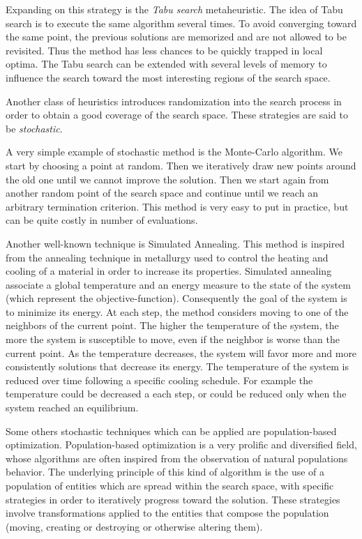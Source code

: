 Expanding on this strategy is the \emph{Tabu search} metaheuristic. The idea of Tabu search is to execute the same algorithm several times. To avoid converging toward the same point, the previous solutions are memorized and are not allowed to be revisited. Thus the method has less chances to be quickly trapped in local optima.
The Tabu search can be extended with several levels of memory to influence the search toward the most interesting regions of the search space.

Another class of heuristics introduces randomization into the search process in order to obtain a good coverage of the search space. These strategies are said to be \emph{stochastic}.

A very simple example of stochastic method is the Monte-Carlo algorithm. We start by choosing a point at random. Then we iteratively draw new points around the old one until we cannot improve the solution. Then we start again from another random point of the search space and continue until we reach an arbitrary termination criterion.
This method is very easy to put in practice, but can be quite costly in number of evaluations.

Another well-known technique is Simulated Annealing. This method is inspired from the annealing technique in metallurgy used to control the heating and cooling of a material in order to increase its properties.
Simulated annealing associate a global temperature and an energy measure to the state of the system (which represent the objective-function). Consequently the goal of the system is to minimize its energy. At each step, the method considers moving to one of the neighbors of the current point. The higher the temperature of the system, the more the system is susceptible to move, even if the neighbor is worse than the current point. As the temperature decreases, the system will favor more and more consistently solutions that decrease its energy.
The temperature of the system is reduced over time following a specific cooling schedule. For example the temperature could be decreased a each step, or could be reduced only when the system reached an equilibrium.

Some others stochastic techniques which can be applied are population-based optimization. Population-based optimization is a very prolific and diversified field, whose algorithms are often inspired from the observation of natural populations behavior. The underlying principle of this kind of algorithm is the use of a population of entities which are spread within the search space, with specific strategies in order to iteratively progress toward the solution. These strategies involve transformations applied to the entities that compose the population (moving, creating or destroying or otherwise altering them).

